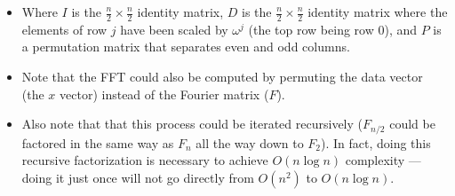\documentclass{article}
\begin{document}
\begin{itemize}
    \begin{itemize}
        \item Where $I$ is the $\frac{n}{2}\times\frac{n}{2}$ identity matrix, $D$ is the $\frac{n}{2}\times\frac{n}{2}$ identity matrix where the elements of row $j$ have been scaled by $\omega^j$ (the top row being row 0), and $P$ is a permutation matrix that separates even and odd columns.
        \item Note that the FFT could also be computed by permuting the data vector (the $x$ vector) instead of the Fourier matrix ($F$).
        \item Also note that that this process could be iterated recursively ($F_{n/2}$ could be factored in the same way as $F_n$ all the way down to $F_2$). In fact, doing this recursive factorization is necessary to achieve $O(n\log n)$ complexity --- doing it just once will not go directly from $O(n^2)$ to $O(n\log n)$.
    \end{itemize}
\end{itemize}
\end{document}
